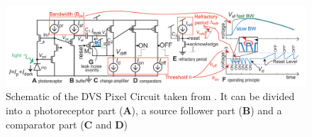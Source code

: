 
\begin{figure}
    \centering
    \includegraphics[width=\linewidth]{chapters/papers/ED/resources/images/intensity-estimation/DVSCircuit.png}
    \caption[Schematic of the DVS Pixel Circuit]{Schematic of the DVS Pixel Circuit taken from \cite{DVSBiases2023}. It can be divided into a photoreceptor part (\textbf{A}), a source follower part (\textbf{B}) and a comparator part (\textbf{C} and \textbf{D})}
    \label{fig:eventCircuit}
\end{figure}

